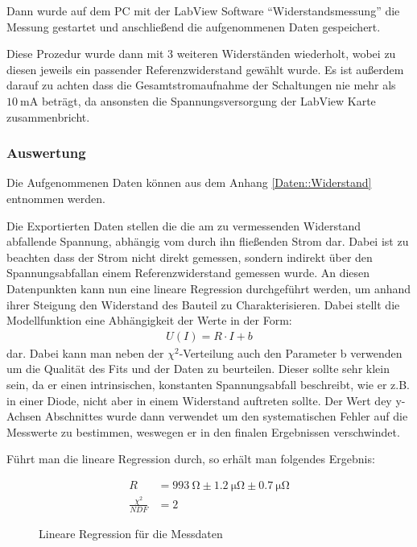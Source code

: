 \documentclass[12pt,twoside,a4paper]{scrartcl}
\begin{document}
				Dann wurde auf dem PC mit der LabView Software ``Widerstandsmessung'' die Messung gestartet und anschließend die aufgenommenen Daten gespeichert.

				Diese Prozedur wurde dann mit 3 weiteren Widerständen wiederholt, wobei zu diesen jeweils ein passender Referenzwiderstand gewählt wurde.
				Es ist außerdem darauf zu achten dass die Gesamtstromaufnahme der Schaltungen nie mehr als $\SI{10}{\milli \ampere}$ beträgt, da ansonsten die Spannungsversorgung der LabView Karte zusammenbricht.

			\subsubsection{Auswertung}

				Die Aufgenommenen Daten können aus dem Anhang \ref{Daten::Widerstand} entnommen werden.

				Die Exportierten Daten stellen die die am zu vermessenden Widerstand abfallende Spannung, abhängig vom durch ihn fließenden Strom dar. Dabei ist zu beachten dass der Strom nicht direkt gemessen, sondern indirekt über den Spannungsabfallan einem Referenzwiderstand gemessen wurde. An diesen Datenpunkten kann nun eine lineare Regression durchgeführt werden, um anhand ihrer Steigung den Widerstand des Bauteil zu Charakterisieren. Dabei stellt die Modellfunktion eine Abhängigkeit der Werte in der Form:
				\begin{align*}
					U(I) = R \cdot I + b
				\end{align*}
				dar. Dabei kann man neben der $\chi^2$-Verteilung auch den Parameter b verwenden um die Qualität des Fits und der Daten zu beurteilen. Dieser sollte sehr klein sein, da er einen intrinsischen, konstanten Spannungsabfall beschreibt, wie er z.B. in einer Diode, nicht aber in einem Widerstand auftreten sollte.
				Der Wert dey y-Achsen Abschnittes wurde dann verwendet um den systematischen Fehler auf die Messwerte zu bestimmen, weswegen er in den finalen Ergebnissen verschwindet.

				Führt man die lineare Regression durch, so erhält man folgendes Ergebnis:

				\begin{figure}[H]
					\centering
					\begin{minipage}{0.69 \textwidth}
						\caption{Lineare Regression für die Messdaten}
					\end{minipage}
					\begin{minipage}{0.29 \textwidth}
						\begin{align*}
							R &= \SI{993}{\ohm} \pm \SI{1.2}{\micro \ohm} \pm \SI{0.7}{\micro \ohm}\\
							\frac{\chi^2}{NDF} &= 2
						\end{align*}
					\end{minipage}
			\end{figure}
\end{document}

